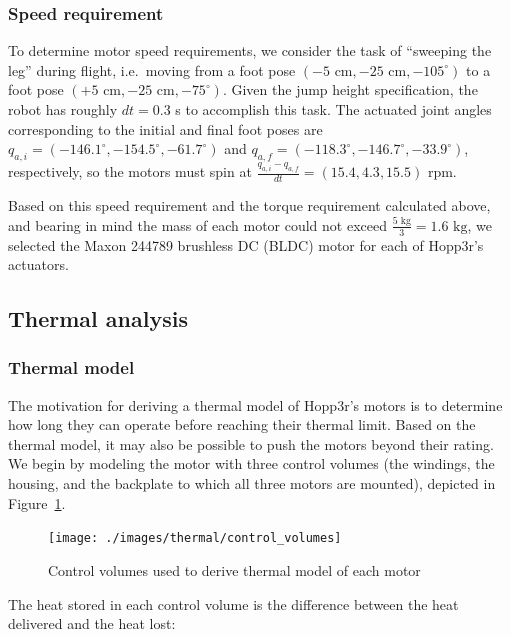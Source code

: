 \documentclass{report}
\begin{document}
\subsubsection[Speed requirement]{Speed requirement}
To determine motor speed requirements, we consider the task of ``sweeping the leg'' during flight, i.e.\ moving from a foot pose $\left(-5 \text{ cm}, -25 \text{ cm},-105^{\circ}\right)$ to a foot pose $\left(+5 \text{ cm}, -25 \text{ cm},-75^{\circ}\right)$. Given the jump height specification, the robot has roughly $dt = 0.3$ s to accomplish this task. The actuated joint angles corresponding to the initial and final foot poses are $q_{a,i} = \left(-146.1^{\circ}, -154.5^{\circ}, -61.7^{\circ}\right)$ and $q_{a,f} = \left(-118.3^{\circ}, -146.7^{\circ}, -33.9^{\circ}\right)$, respectively, so the motors must spin at $\frac{q_{a,i} - q_{a,f}}{dt} = \left(15.4, 4.3, 15.5\right)$ rpm.

Based on this speed requirement and the torque requirement calculated above, and bearing in mind the mass of each motor could not exceed $\frac{5\text{ kg}}{3} = 1.6\text{ kg}$, we selected the Maxon 244789 brushless DC (BLDC) motor \cite{Maxon:244879} for each of Hopp3r's actuators. 
\subsection[Thermal analysis]{Thermal analysis}\label{sec:thermalmodel}
\subsubsection[Thermal model]{Thermal model}
The motivation for deriving a thermal model of Hopp3r's motors is to determine how long they can operate before reaching their thermal limit. Based on the thermal model, it may also be possible to push the motors beyond their rating. We begin by modeling the motor with three control volumes (the windings, the housing, and the backplate to which all three motors are mounted), depicted in Figure~\ref{fig:control_volumes}.

\begin{figure}[H]
\centering
\texttt{[image: ./images/thermal/control\_volumes]}
\caption[Control volumes used to derive thermal model of each motor]{Control volumes used to derive thermal model of each motor}
\label{fig:control_volumes}
\end{figure}

The heat stored in each control volume is the difference between the heat delivered and the heat lost:
\end{document}
